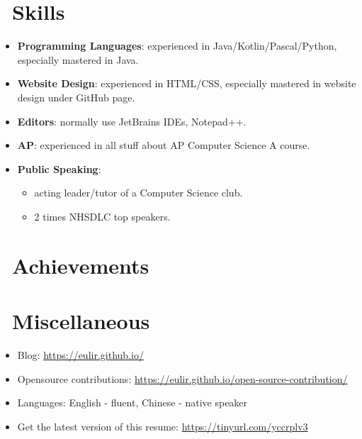 \documentclass{resume}
\begin{document}
\section{\faCogs\ Skills}
\begin{itemize}[parsep=0.5ex]
  \item \textbf{Programming Languages}:
    experienced in Java/Kotlin/Pascal/Python, especially mastered in Java.
  \item \textbf{Website Design}:
	experienced in HTML/CSS, especially mastered in website design under GitHub page.
  \item \textbf{Editors}:
    normally use JetBrains IDEs, Notepad++.
  \item \textbf{AP}:
    experienced in all stuff about AP Computer Science A course.
  \item \textbf{Public Speaking}:
	\begin{itemize}
	  \item acting leader/tutor of a Computer Science club.
	  \item 2 times NHSDLC top speakers.
	\end{itemize}
\end{itemize}

\section{\faHeartO\ Achievements}

\section{\faInfo\ Miscellaneous}
\begin{itemize}[parsep=0.5ex]
  \item Blog: \url{https://eulir.github.io/}
  \item Opensource contributions: \url{https://eulir.github.io/open-source-contribution/} \\
  \item Languages: English - fluent, Chinese - native speaker
  \item Get the latest version of this resume: \url{https://tinyurl.com/yccrplv3}
\end{itemize}
\end{document}
